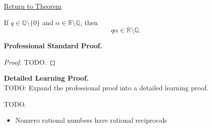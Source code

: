 \newpage
{}
\label{prf:nonzero-rational-times-irrational-is-irrational}

\begin{remark*}[Return]
\hyperref[thm:nonzero-rational-times-irrational-is-irrational]{Return to Theorem}
\end{remark*}

\begin{theorem*}
If $q\in\mathbb{Q}\setminus\{0\}$ and $\alpha\in\mathbb{R}\setminus\mathbb{Q}$,
then
\[
q\alpha\in\mathbb{R}\setminus\mathbb{Q}.
\]
\end{theorem*}

\textbf{Professional Standard Proof.}~\\
\begin{proof}
TODO.
\end{proof}

\textbf{Detailed Learning Proof.}~\\
TODO: Expand the professional proof into a detailed learning proof.


\begin{remark*}
TODO.
\end{remark*}

\begin{dependencies}
\begin{itemize}
  \item Nonzero rational numbers have rational reciprocals
\end{itemize}
\end{dependencies}

